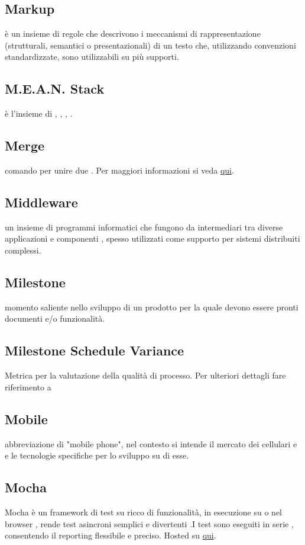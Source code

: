 \documentclass[12pt,a4paper]{article}
\begin{document}
\subsection{Markup} 
 è un insieme di regole che descrivono i meccanismi di rappresentazione (strutturali, semantici o presentazionali) di un testo che, utilizzando convenzioni standardizzate, sono utilizzabili su più supporti.

\subsection{M.E.A.N. Stack}
è l'insieme di , , , .

\subsection{Merge} 
 comando  per unire due . Per maggiori informazioni si veda \href{https://git-scm.com/docs/}{qui}.

\subsection{Middleware} 
 un insieme di programmi informatici che fungono da intermediari tra diverse applicazioni e componenti ,  spesso utilizzati come supporto per sistemi distribuiti complessi.


\subsection{Milestone} 
 momento saliente nello sviluppo di un prodotto  per la quale devono essere pronti documenti e/o funzionalità.

\subsection{Milestone Schedule Variance}
 Metrica per la valutazione della qualità di processo. Per ulteriori dettagli fare riferimento a \PdQ{}

\subsection{Mobile} 
 abbreviazione di "mobile phone", nel contesto si intende il mercato dei cellulari e  e le tecnologie specifiche per lo sviluppo su di esse.

\subsection{Mocha} 
 Mocha è un framework di test su  ricco di funzionalità, in esecuzione su  o nel browser , rende test asincroni semplici  e divertenti .I test sono eseguiti in serie , consentendo il reporting flessibile e preciso. Hosted su 
\href{https://github.com/mochajs/mocha}{qui}.
\end{document}
